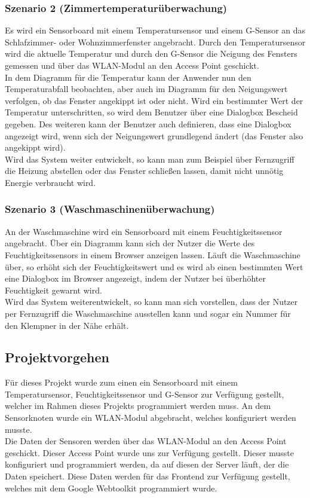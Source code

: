 \documentclass[12pt,a4paper,twoside]{article}
\begin{document}
\subsubsection{Szenario 2 (Zimmertemperaturüberwachung)}
Es wird ein Sensorboard mit einem Temperatursensor und einem G-Sensor an das Schlafzimmer- oder Wohnzimmerfenster angebracht. Durch den Temperatursensor wird die aktuelle Temperatur und durch den G-Sensor die Neigung des Fensters gemessen und über das WLAN-Modul an den Access Point geschickt. \\
In dem Diagramm für die Temperatur kann der Anwender nun den Temperaturabfall beobachten, aber auch im Diagramm für den Neigungswert verfolgen, ob das Fenster angekippt ist oder nicht.
Wird ein bestimmter Wert der Temperatur unterschritten, so wird dem Benutzer über eine Dialogbox Bescheid gegeben. Des weiteren kann der Benutzer auch definieren, dass eine Dialogbox angezeigt wird, wenn sich der Neigungswert grundlegend ändert (das Fenster also angekippt wird). \\
Wird das System weiter entwickelt, so kann man zum Beispiel über Fernzugriff die Heizung abstellen oder das Fenster schließen lassen, damit nicht unnötig Energie verbraucht wird.

\subsubsection{Szenario 3 (Waschmaschinenüberwachung)}
An der Waschmaschine wird ein Sensorboard mit einem Feuchtigkeitssensor angebracht. Über ein Diagramm kann sich der Nutzer die Werte des Feuchtigkeitssensors in einem Browser anzeigen lassen. Läuft die Waschmaschine über, so erhöht sich der Feuchtigkeitswert und es wird ab einen bestimmten Wert eine Dialogbox im Browser angezeigt, indem der Nutzer bei überhöhter Feuchtigkeit gewarnt wird. \\
Wird das System weiterentwickelt, so kann man sich vorstellen, dass der Nutzer per Fernzugriff die Waschmaschine ausstellen kann und sogar ein Nummer für den Klempner in der Nähe erhält.

\subsection{Projektvorgehen}
Für dieses Projekt wurde zum einen ein Sensorboard mit einem Temperatursensor, Feuchtigkeitssensor und G-Sensor zur Verfügung gestellt, welcher im Rahmen dieses Projekts programmiert werden muss. An dem Sensorknoten wurde ein WLAN-Modul abgebracht, welches konfiguriert werden musste.\\
Die Daten der Sensoren werden über das WLAN-Modul an den Access Point geschickt. Dieser Access Point wurde uns zur Verfügung gestellt. Dieser musste konfiguriert und programmiert werden, da auf diesen der Server läuft, der die Daten speichert. Diese Daten werden für das Frontend zur Verfügung gestellt, welches mit dem Google Webtoolkit programmiert wurde. 
\end{document}
